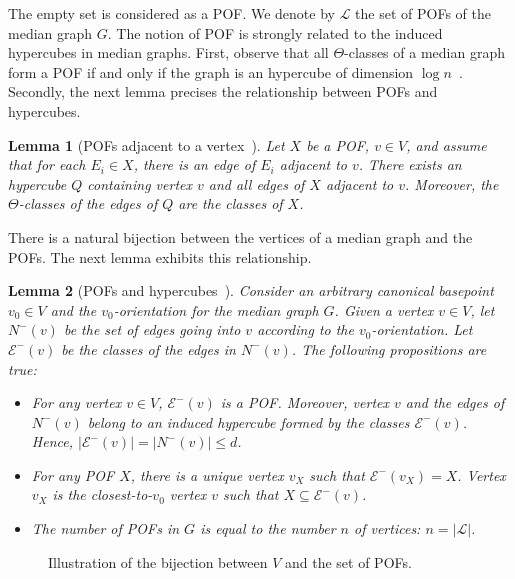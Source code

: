 \documentclass{article}
\newtheorem{lemma}{Lemma}
\newcommand{\card}[1]{\left| #1 \right|}
\begin{document}
The empty set is considered as a POF. We denote by $\mathcal{L}$ the set of POFs of the median graph $G$. The notion of POF is strongly related to the induced hypercubes in median graphs. First, observe that all $\Theta$-classes of a median graph form a POF if and only if the graph is an hypercube of dimension $\log n$~\cite{Ko09,MoMuRo98}. Secondly, the next lemma precises the relationship  between POFs and hypercubes.


\begin{lemma}[POFs adjacent to a vertex~\cite{BeHa21}]
Let $X$ be a POF, $v \in V$, and assume that for each $E_i \in X$, there is an edge of $E_i$ adjacent to $v$. There exists an hypercube $Q$ containing vertex $v$ and all edges of $X$ adjacent to $v$. Moreover, the $\Theta$-classes of the edges of $Q$ are the classes of $X$.
\label{le:pof_adjacent}
\end{lemma}

There is a natural bijection between the vertices of a median graph and the POFs. The next lemma exhibits this relationship.

\begin{lemma}[POFs and hypercubes~\cite{BaChDrKo06,BaQuSaMa02,Ko09}]
Consider an arbitrary canonical basepoint $v_0 \in V$ and the $v_0$-orientation for the median graph $G$. Given a vertex $v \in V$, let $N^-(v)$ be the set of edges going into $v$ according to the $v_0$-orientation. Let $\mathcal{E}^-(v)$ be the classes of the edges in $N^-(v)$. The following propositions are true:
\begin{itemize}
\item For any vertex $v\in V$, $\mathcal{E}^-(v)$ is a POF. Moreover, vertex $v$ and the edges of $N^-(v)$ belong to an induced hypercube formed by the classes $\mathcal{E}^-(v)$. Hence, $\card{\mathcal{E}^-(v)} = \card{N^-(v)} \le d$.
\item For any POF $X$, there is a unique vertex $v_X$ such that $\mathcal{E}^-(v_X) = X$. Vertex $v_X$ is the closest-to-$v_0$ vertex $v$ such that $X \subseteq \mathcal{E}^-(v)$.
\item The number of POFs in $G$ is equal to the number $n$ of vertices: $n = \card{\mathcal{L}}$.
\end{itemize}
\label{le:pof_hypercube}
\end{lemma}

\begin{figure}[h]
\centering
\scalebox{0.95}{}
\caption{Illustration of the bijection between $V$ and the set of POFs.}
\label{fig:vertices_pof}
\end{figure}
\end{document}
